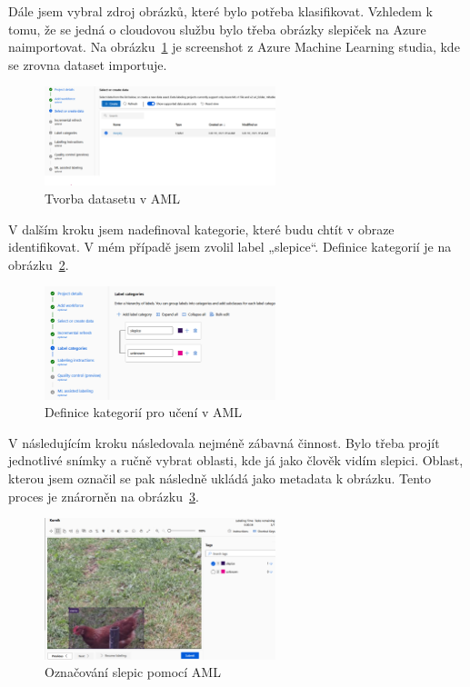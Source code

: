 Dále jsem vybral zdroj obrázků, které bylo potřeba klasifikovat.
Vzhledem k tomu, že se jedná o cloudovou službu bylo třeba obrázky slepiček na Azure naimportovat.
Na obrázku~\ref{fig:dataset_selection} je screenshot z Azure Machine Learning studia, kde se zrovna dataset importuje.

\begin{figure}[htbp]
    \centering
    \includegraphics[width=0.6\textwidth]{img/dataset_selection}
    \caption{Tvorba datasetu v AML}
    \label{fig:dataset_selection}
\end{figure}

V dalším kroku jsem nadefinoval kategorie, které budu chtít v obraze identifikovat.
V mém případě jsem zvolil label „slepice“.
Definice kategorií je na obrázku~\ref{fig:category_definition}.

\begin{figure}[htbp]
    \centering
    \includegraphics[width=0.6\textwidth]{img/category_definition}
    \caption{Definice kategorií pro učení v AML}
    \label{fig:category_definition}
\end{figure}

V následujícím kroku následovala nejméně zábavná činnost.
Bylo třeba projít jednotlivé snímky a ručně vybrat oblasti, kde já jako člověk vidím slepici.
Oblast, kterou jsem označil se pak následně ukládá jako metadata k obrázku.
Tento proces je znárorněn na obrázku~\ref{fig:chicken_labeling}.

\begin{figure}[htbp]
    \centering
    \includegraphics[width=0.6\textwidth]{img/chicken_labeling}
    \caption{Označování slepic pomocí AML}
    \label{fig:chicken_labeling}
\end{figure}

